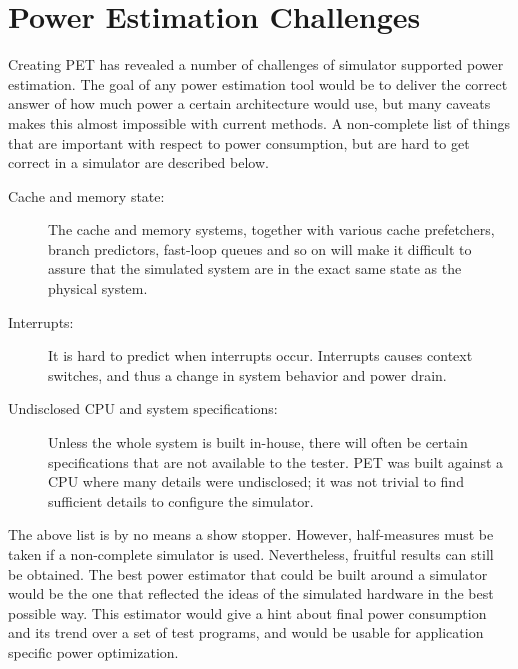 \section{Power Estimation Challenges}

Creating PET has revealed a number of challenges of simulator supported power
estimation. The goal of any power estimation tool would be to deliver the
correct answer of how much power a certain architecture would use, but many
caveats makes this almost impossible with current methods. A non-complete list
of things that are important with respect to power consumption, but are hard to
get correct in a simulator are described below.

\begin{description}
    \item[Cache and memory state:]
        The cache and memory systems, together with various cache prefetchers,
        branch predictors, fast-loop queues and so on will make it difficult to
        assure that the simulated system are in the exact same state as the
        physical system.
    \item[Interrupts:]
        It is hard to predict when interrupts occur. Interrupts causes context
        switches, and thus a change in system behavior and power drain.
    \item[Undisclosed CPU and system specifications:]
        Unless the whole system is built in-house, there will often be certain
        specifications that are not available to the tester. PET was built
        against a CPU where many details were undisclosed; it was not trivial to
        find sufficient details to configure the simulator.
\end{description}

The above list is by no means a show stopper. However, half-measures must be
taken if a non-complete simulator is used. Nevertheless, fruitful results can
still be obtained. The best power estimator that could be built around a
simulator would be the one that reflected the ideas of the simulated hardware in
the best possible way. This estimator would give a hint about final power
consumption and its trend over a set of test programs, and would be usable for
application specific power optimization.
